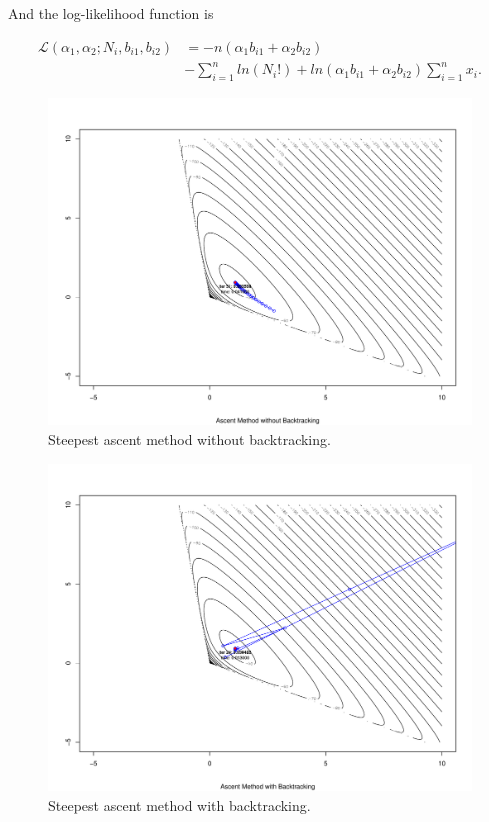And the log-likelihood function is

\vspace{-0.1in}
\begin{equation*}
\begin{split}
\mathcal L (\alpha_1, \alpha_2; N_i, b_{i1}, b_{i2})
&= - n (\alpha_1 b_{i1} + \alpha_2 b_{i2}) \\
& - \sum_{i=1}^{n} ln(N_i!) + ln(\alpha_1 b_{i1} + \alpha_2 b_{i2}) \sum_{i=1}^{n} x_i.
\end{split}
\end{equation*}

\begin{figure}[h!]
\includegraphics[scale=0.3]{figs/ascent-noback.pdf}
\caption{Steepest ascent method without backtracking.}
\label{img:ascent-noback}
\end{figure}

\begin{figure}[h!]
\includegraphics[scale=0.3]{figs/ascent-back.pdf}
\caption{Steepest ascent method with backtracking.}
\label{img:ascent-back}
\end{figure}

